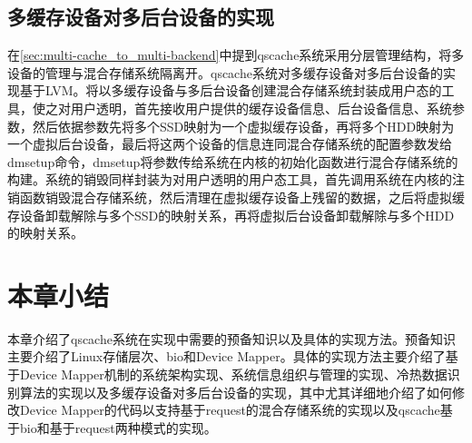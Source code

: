 \subsection{多缓存设备对多后台设备的实现}

在\ref{sec:multi-cache_to_multi-backend}中提到qscache系统采用分层管理结构，将多设备的管理与混合存储系统隔离开。qscache系统对多缓存设备对多后台设备的实现基于LVM。将以多缓存设备与多后台设备创建混合存储系统封装成用户态的工具，使之对用户透明，首先接收用户提供的缓存设备信息、后台设备信息、系统参数，然后依据参数先将多个SSD映射为一个虚拟缓存设备，再将多个HDD映射为一个虚拟后台设备，最后将这两个设备的信息连同混合存储系统的配置参数发给dmsetup命令，dmsetup将参数传给系统在内核的初始化函数进行混合存储系统的构建。系统的销毁同样封装为对用户透明的用户态工具，首先调用系统在内核的注销函数销毁混合存储系统，然后清理在虚拟缓存设备上残留的数据，之后将虚拟缓存设备卸载解除与多个SSD的映射关系，再将虚拟后台设备卸载解除与多个HDD的映射关系。


\section{本章小结}
本章介绍了qscache系统在实现中需要的预备知识以及具体的实现方法。预备知识主要介绍了Linux存储层次、bio和Device Mapper。具体的实现方法主要介绍了基于Device Mapper机制的系统架构实现、系统信息组织与管理的实现、冷热数据识别算法的实现以及多缓存设备对多后台设备的实现，其中尤其详细地介绍了如何修改Device Mapper的代码以支持基于request的混合存储系统的实现以及qscache基于bio和基于request两种模式的实现。